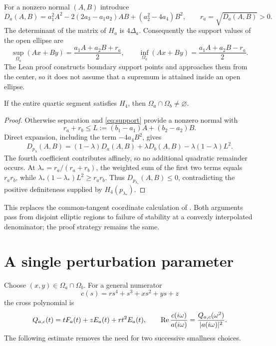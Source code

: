 \documentclass[11pt]{article}
\begin{document}
For a nonzero normal $(A,B)$ introduce
\[
 D_a(A,B)=a_1^2A^2-2(2a_3-a_1a_2)AB+(a_2^2-4a_4)B^2,
 \qquad r_a=\sqrt{D_a(A,B)}>0.
\]
The determinant of the matrix of $H_a$ is $4\Delta_a$. Consequently the support values of the open ellipse are
\begin{equation}\label{eq:support}
 \sup_{\Omega_a}(Ax+By)=\frac{a_1A+a_2B+r_a}{2},\qquad
 \inf_{\Omega_a}(Ax+By)=\frac{a_1A+a_2B-r_a}{2}.
\end{equation}
The Lean proof constructs boundary support points and approaches them from the center, so it does not assume that a supremum is attained inside an open ellipse.

\begin{lemma}\label{lem:intersection}
If the entire quartic segment satisfies $H_4$, then $\Omega_a\cap\Omega_b\ne\varnothing$.
\end{lemma}
\begin{proof}
Otherwise separation and \eqref{eq:support} provide a nonzero normal with
\[
 r_a+r_b\le L:=(b_1-a_1)A+(b_2-a_2)B.
\]
Direct expansion, including the term $-4a_4B^2$, gives
\begin{equation}\label{eq:dualblend}
 D_{p_\lambda}(A,B)
 =(1-\lambda)D_a(A,B)+\lambda D_b(A,B)-\lambda(1-\lambda)L^2.
\end{equation}
The fourth coefficient contributes affinely, so no additional quadratic remainder occurs. At $\lambda_*=r_a/(r_a+r_b)$, the weighted sum of the first two terms equals $r_ar_b$, while $\lambda_*(1-\lambda_*)L^2\ge r_ar_b$. Thus $D_{p_{\lambda_*}}(A,B)\le0$, contradicting the positive definiteness supplied by $H_4(p_{\lambda_*})$.
\end{proof}

This replaces the common-tangent coordinate calculation of \cite[Lemma~2]{yuWang2001Quartic}. Both arguments pass from disjoint elliptic regions to failure of stability at a convexly interpolated denominator; the proof strategy remains the same.

\section{A single perturbation parameter}
Choose $(x,y)\in\Omega_a\cap\Omega_b$. For a general numerator
\[
 c(s)=r s^4+s^3+xs^2+ys+z
\]
the cross polynomial is
\begin{equation}\label{eq:cross}
 Q_{a,c}(t)=tF_a(t)+zE_a(t)+rt^2E_a(t),\qquad
 \operatorname{Re}\frac{c(i\omega)}{a(i\omega)}=\frac{Q_{a,c}(\omega^2)}{|a(i\omega)|^2}.
\end{equation}
The following estimate removes the need for two successive smallness choices.
\end{document}

